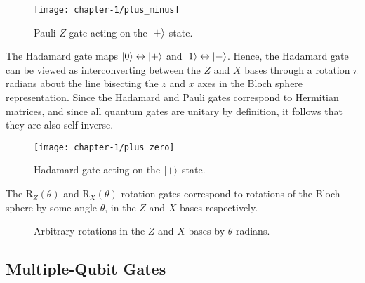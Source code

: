 \begin{figure}[H]
    \centering
    \texttt{[image: chapter-1/plus\_minus]}
    \caption{Pauli $Z$ gate acting on the $\ket +$ state.}
\end{figure}

The Hadamard gate maps $\ket 0 \leftrightarrow \ket +$ and $\ket 1 \leftrightarrow \ket -$. Hence, the Hadamard gate can be viewed as interconverting between the $Z$ and $X$ bases through a rotation $\pi$ radians about the line bisecting the $z$ and $x$ axes in the Bloch sphere representation. Since the Hadamard and Pauli gates correspond to Hermitian matrices, and since all quantum gates are unitary by definition, it follows that they are also self-inverse.

\begin{figure}[H]
    \centering
    \texttt{[image: chapter-1/plus\_zero]}
    \caption{Hadamard gate acting on the $\ket +$ state.}
\end{figure}

The R$_Z(\theta)$ and R$_X(\theta)$ rotation gates correspond to rotations of the Bloch sphere by some angle $\theta$, in the $Z$ and $X$ bases respectively.

\begin{figure}[H]
    \centering
    \begin{minipage}{0.45\textwidth}
        \centering
    \end{minipage}
    \begin{minipage}{0.45\textwidth}
        \centering
    \end{minipage}
    \caption{Arbitrary rotations in the $Z$ and $X$ bases by $\theta$ radians.}
\end{figure}

\subsection{Multiple-Qubit Gates}

